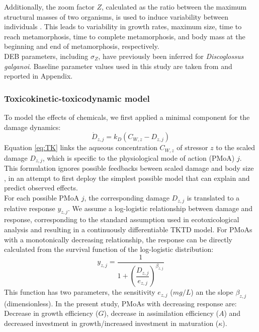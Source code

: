 \documentclass[preprint,12pt]{elsarticle}
\begin{document}
%
Additionally, the zoom factor $Z$, calculated as the ratio between the maximum structural masses of two organisms, 
is used to induce variability between individuals \citep{hansulDynamicEnergyBudget2026}. 
This leads to variability in growth rates, maximum size, time to reach metamorphosis, 
time to complete metamorphosis, 
and body mass at the beginning and end of metamorphosis, respectively.\\
DEB parameters, including $\sigma_{Z}$, have previously been inferred for \textit{Discoglossus galganoi}. 
Baseline parameter values used in this study are taken from \citet{hansulDynamicEnergyBudget2026} and reported in Appendix. 
%
\subsubsection{Toxicokinetic-toxicodynamic model}
%
To model the effects of chemicals, we first applied a minimal component for the damage dynamics: 
%
\begin{equation}
    \dot{D}_{z,j} = k_D \left( C_{W,z}  - D_{z,j} \right)
    \label{eq:TK}
\end{equation}
%
Equation \ref{eq:TK} links the aqueous concentration $C_{W,z}$ of stressor $z$ to 
the scaled damage $D_{z,j}$, which is specific to the physiological mode of action (PMoA) $j$.
This formulation ignores possible feedbacks beween scaled damage and body size \citep{jagerRevisitingSimplifiedDEBtox2020}, 
in an attempt to first deploy the simplest possible model that can explain and predict observed effects. \\ 
For each possible PMoA $j$, the corresponding damage $D_{z,j}$ is translated to a relative response $y_{z,j}$. 
We assume a log-logistic relationship between damage and response, 
corresponding to the standard assumption used in ecotoxicological analysis and resulting in a continuously differentiable 
TKTD model. 
For PMoAs with a monotonically decreasing relationship, the response can be directly calculated from the survival function 
of the log-logistic distribution:
%
\begin{equation}
    y_{z,j} = \dfrac{1}{ 1 + \left( \dfrac{D_{z,j}} {e_{z,j}} \right) ^ {\beta_{z,j}} }
    \label{eq:TD_decrease}
\end{equation}
%
This function has two parameters, the sensitivity $e_{z,j}$ ($mg/L$) an the slope $\beta_{z,j}$ (dimensionless). 
In the present study, PMoAs with decreasing response are: 
Decrease in growth efficiency ($G$), 
decrease in assimilation efficiency ($A$) 
and decreased investment in growth/increased investment in maturation ($\kappa$).
\end{document}
